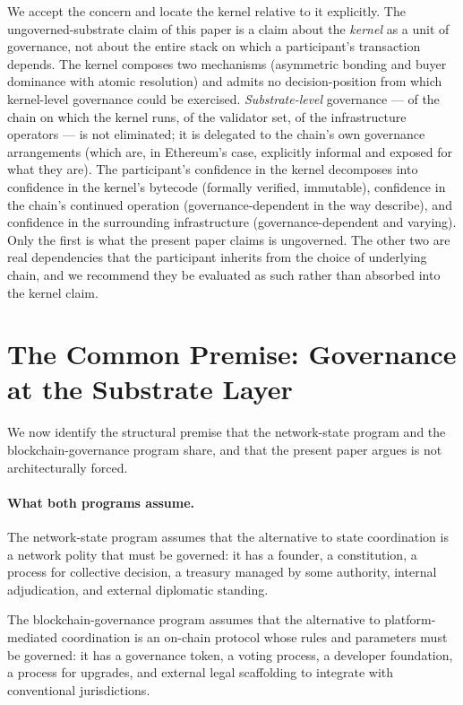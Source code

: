 \documentclass[11pt,a4paper]{article}
\theoremstyle{remark}
\begin{document}
We accept the concern and locate the kernel relative to it
explicitly. The ungoverned-substrate claim of this paper is a
claim about the \emph{kernel} as a unit of governance, not about
the entire stack on which a participant's transaction depends.
The kernel composes two mechanisms (asymmetric bonding and buyer
dominance with atomic resolution) and admits no decision-position
from which kernel-level governance could be exercised.
\emph{Substrate-level} governance --- of the chain on which the
kernel runs, of the validator set, of the infrastructure
operators --- is not eliminated; it is delegated to the chain's
own governance arrangements (which are, in Ethereum's case,
explicitly informal and exposed for what they are). The
participant's confidence in the kernel decomposes into confidence
in the kernel's bytecode (formally verified, immutable),
confidence in the chain's continued operation
(governance-dependent in the way \citeauthor{defilippi_mannan_reijers_2022}
describe), and confidence in the surrounding infrastructure
(governance-dependent and varying). Only the first is what the
present paper claims is ungoverned. The other two are real
dependencies that the participant inherits from the choice of
underlying chain, and we recommend they be evaluated as such
rather than absorbed into the kernel claim.

\section{The Common Premise: Governance at the Substrate Layer}
\label{sec:common-premise}

We now identify the structural premise that the network-state
program and the blockchain-governance program share, and that
the present paper argues is not architecturally forced.

\paragraph{What both programs assume.}
The network-state program assumes that the alternative to state
coordination is a network polity that must be governed: it has
a founder, a constitution, a process for collective decision, a
treasury managed by some authority, internal adjudication, and
external diplomatic standing.

The blockchain-governance program assumes that the alternative
to platform-mediated coordination is an on-chain protocol whose
rules and parameters must be governed: it has a governance
token, a voting process, a developer foundation, a process for
upgrades, and external legal scaffolding to integrate with
conventional jurisdictions.
\end{document}
